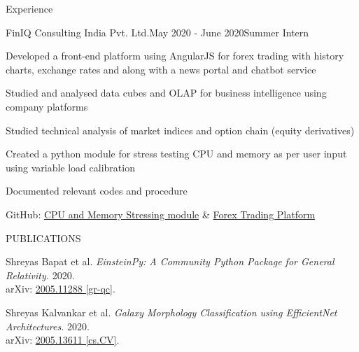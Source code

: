 \documentclass{resume} %
\begin{document}
\smallskip
\smallskip
\smallskip
\begin{rSection}{Experience}

\begin{rSubsection}{FinIQ Consulting India Pvt. Ltd.}{May 2020 - June 2020}{Summer Intern}{}
\item Developed a front-end platform using AngularJS for forex trading with history charts, exchange rates and along with a news portal and chatbot service
\item Studied and analysed data cubes and OLAP for business intelligence using company platforms
\item Studied technical analysis of market indices and option chain (equity derivatives)
\item Created a python module for stress testing CPU and memory as per user input using variable load calibration
\item Documented relevant codes and procedure
\item GitHub: \href{https://github.com/obi-wan-shinobi/Stress-test}{CPU and Memory Stressing module} \& \href{https://github.com/obi-wan-shinobi/Forex-Trading}{Forex Trading Platform}
\end{rSubsection}


\end{rSection}
\smallskip

\begin{rSection}{PUBLICATIONS}
\item Shreyas Bapat et al. \textit{EinsteinPy: A Community Python Package for General Relativity.} 2020.\\ arXiv: \href{https://arxiv.org/abs/2005.11288}{2005.11288 [gr-qc]}.

\item Shreyas Kalvankar et al. \textit{Galaxy Morphology Classification using EfficientNet Architectures.} 2020.\\ arXiv:
\href{https://arxiv.org/abs/2008.13611}{2005.13611 [cs.CV]}.

\end{rSection}
\end{document}
